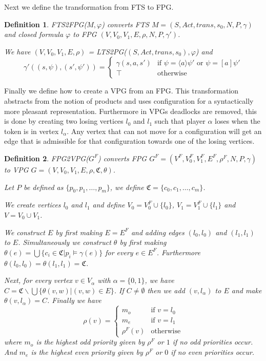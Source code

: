 \documentclass[]{article}
\newtheorem{definition}{Definition}[section]
\begin{document}
Next we define the transformation from FTS to FPG.
\begin{definition}
	\label{def_FTS2FPG}
	FTS2FPG($M, \varphi$) converts FTS $M = (S, Act, trans, s_0, N, P, \gamma)$ and closed formula $\varphi$ to FPG $(V, V_0, V_1, E, \rho, N, P, \gamma')$.
	
	We have $(V, V_0, V_1, E, \rho)$ = LTS2PG($(S, Act, trans, s_0), \varphi$) and
	\[ \gamma'((s, \psi),(s', \psi')) = \begin{cases}
	\gamma(s,a,s') & \text{if }\psi = \langle a \rangle \psi'\text{ or }\psi = [a]\psi' \\
	\top & \text{otherwise}
	\end{cases}\]
\end{definition}
Finally we define how to create a VPG from an FPG. This transformation abstracts from the notion of products and uses configuration for a syntactically more pleasant representation. Furthermore in VPGs deadlocks are removed, this is done by creating two losing vertices $l_0$ and $l_1$ such that player $\alpha$ loses when the token is in vertex $l_\alpha$. Any vertex that can not move for a configuration will get an edge that is admissible for that configuration towards one of the losing vertices.
\begin{definition}
	\label{def_FPG2VPG}
	FPG2VPG($G^F$) converts FPG $G^F = (V^F, V_0^F, V_1^F, E^F, \rho^F, N, P, \gamma)$ to VPG $G = (V, V_0, V_1, E, \rho, \mathfrak{C}, \theta)$.
	
	Let $P$ be defined as  $\{p_0, p_1, \dots, p_m\}$, we define $\mathfrak{C} = \{c_0, c_1, \dots, c_m\}$.
	
	We create vertices $l_0$ and $l_1$ and define $V_0 = V_0^F \cup \{l_0\}$, $V_1 = V_1^F \cup \{l_1\}$ and $V = V_0 \cup V_1$.
	
	We construct $E$ by first making $E = E^F$ and adding edges $(l_0, l_0)$ and $(l_1, l_1)$ to $E$. Simultaneously we construct $\theta$ by first making $\theta(e) = \bigcup\{c_i \in \mathfrak{C} | p_i \models \gamma(e)\}$ for every $e \in E^F$. Furthermore $\theta(l_0,l_0) = \theta(l_1,l_1) = \mathfrak{C}$.
	
	Next, for every vertex $v \in V_\alpha$ with $\alpha = \{0,1\}$, we have $C = \mathfrak{C} \backslash \bigcup \{\theta(v,w)|(v,w) \in E\}$. If $C \neq \emptyset$ then we add $(v, l_\alpha)$ to $E$ and make $\theta(v,l_\alpha) = C$.
	Finally we have 
	\[ \rho(v) = \begin{cases}
	m_o  & \text{if } v = l_0 \\
	m_e & \text{if } v = l_1 \\
	\rho^F(v) &\text{otherwise}
	\end{cases} \]
	where $m_o$ is the highest odd priority given by $\rho^F$ or $1$ if no odd priorities occur. And $m_e$ is the highest even priority given by $\rho^F$ or $0$ if no even priorities occur.
\end{definition}
\end{document}
